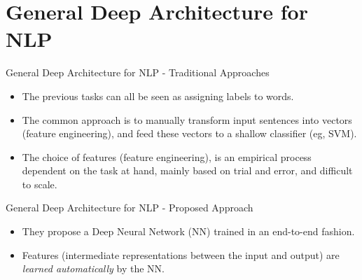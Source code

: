 \documentclass[handout]{beamer} %
\begin{document}
  \section{General Deep Architecture for NLP}
  \begin{frame}{General Deep Architecture for NLP - Traditional Approaches}
      \begin{itemize}[<+->]

         \item The previous tasks can all be seen as assigning labels to words.
         \item The common approach is to manually transform input sentences into
             vectors (feature engineering), and feed these vectors to a shallow
             classifier (eg, SVM).
         \item The choice of features (feature engineering), is an empirical
             process dependent on the task at hand, mainly based on trial and
             error, and difficult to scale.

      \end{itemize}
  \end{frame}


  \begin{frame}{General Deep Architecture for NLP - Proposed Approach}
      \begin{itemize}[<+->]

          \item They propose a Deep Neural Network (NN) trained in an end-to-end
              fashion.
          \item Features (intermediate representations between the input and
              output) are \textit{learned automatically} by the NN.

      \end{itemize}
  \end{frame}
\end{document}
